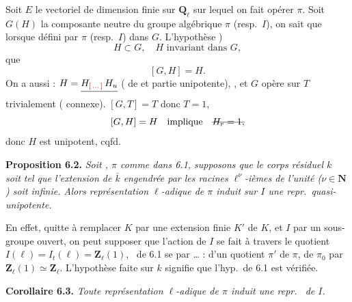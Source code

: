 \documentclass[11pt,a4paper]{article}
\begin{document}

Soit $E$ le vectoriel de dimension finie sur $\mathbf{Q}_{\ell}$ sur lequel on fait opérer $\pi$. Soit  $G(H)$ la composante neutre du groupe algébrique  $\pi$ (resp.\ $I$), on sait que lorsque \struck{\ill{}}  défini par $\pi$ (resp.\ $I$) dans $G$. L'hypothèse  )
\[ H \subset G , \quad H \text{ invariant dans } G , \]
que
\[ [G, H] = H . \]
On a aussi : $H = \struck{H_{\ill{}}\, H_{u}}$  ( de  \struck{\ill{}}  et partie unipotente), ,  et $G$ opère sur  $T$ \struck{(\ill{} \ill{} \ill{})} trivialement ( \ill{} connexe).  $[G, T] = T$ donc $T = 1$,
\[ [G, H] = H \quad \text{implique} \quad \text{\struck{$H_{r} = 1$,}} \]
donc $H$ est unipotent, cqfd.

\textbf{Proposition 6.2.} \emph{Soit , $\pi$ comme dans 6.1,  supposons que le corps résiduel $k$ soit tel que l'extension  de $\overline{k}$ engendrée par les racines $\ell^{\nu}$-ièmes de l'unité ($\nu \in \mathbf{N}$) soit infinie. Alors   représentation $\ell$-adique de $\pi$ induit sur $I$ une repr.\ quasi-unipotente.}

En effet, quitte à remplacer $K$ par une extension finie $K'$ de $K$, et $I$ par un sous-groupe ouvert, on peut supposer que l'action de $I$ se fait à travers le quotient $I(\ell) = I_{t}(\ell) = \mathbf{Z}_{\ell}(1)$, \uncertain{\ill{}} \ de 6.1 se  par \ill{} … :   d'un quotient $\pi'$ de $\pi$, \ill{}  de $\pi_{0}$ par $\mathbf{Z}_{\ell}(1) \simeq \mathbf{Z}_{\ell}$. L'hypothèse faite sur $k$ signifie que l'hyp.\ de 6.1 est vérifiée.

\textbf{Corollaire 6.3.} \emph{Toute représentation $\ell$-adique \struck{\ill{}}  de $\pi$ induit une repr.\   de $I$.}
\end{document}
